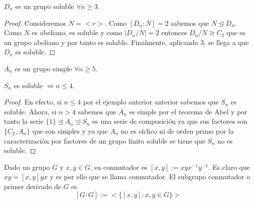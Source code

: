 \begin{corollary}
$D_n$ es un grupo soluble $\forall n \ge 3$.
\end{corollary}
\begin{proof}
Consideremos $N = <r>$. Como $[D_n:N] = 2$ sabemos que $N \trianglelefteq D_n$. Como $N$ es abeliano, es soluble y como $|D_n/N| = 2$ entonces $D_n/N \cong C_2$ que es un grupo abeliano y por tanto es soluble. Finalmente, aplicando 3. se llega a que $D_n$ es soluble.
\end{proof}

\begin{theorem}
$A_n$ es un grupo simple $\forall n \ge 5$.
\end{theorem}

\begin{corollary}
$S_n$ es soluble $\iff n \le 4$.
\end{corollary}
\begin{proof}
En efecto, si $n \le 4$ por el ejemplo anterior anterior sabemos que $S_n$ es soluble. Ahora, si $n > 4$ sabemos que $A_n$ es simple por el teorema de Abel y por tanto la serie $\{1\} \trianglelefteq A_n \trianglelefteq S_n$ es una serie de composición ya que sus factores son $\{C_2,A_n\}$ que son simples y ya que $A_n$ no es cíclico ni de orden primo por la caracterización por factores de un grupo finito soluble se tiene que $S_n$ no es soluble.
\end{proof}

\begin{definition}
Dado un grupo $G$ y $x,y \in G$, su conmutador es $[x,y] := xyx^{-1}y^{-1}$. Es claro que $xy = [x,y]yx$ y es por ello que se llama conmutador. El subgrupo conmutador o primer derivado de $G$ es $$[G:G] := <\{[x,y]:x,y \in G\}>$$
\end{definition}

